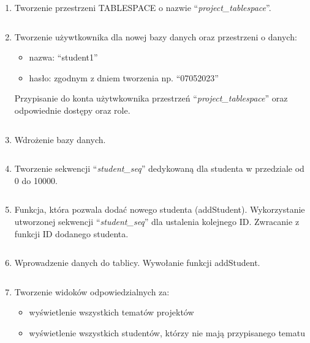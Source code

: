 \documentclass[a4paper, 10pt]{article}
\begin{document}
\begin{enumerate}
	\item Tworzenie przestrzeni TABLESPACE o nazwie ``\emph{project\_tablespace}''.
		\begin{lstlisting}[style=SQL, caption=\textit{Tworzenie przestrzeni TABLESPACE o nazwie ``project\_tablespace''}]
		\end{lstlisting}
	\item Tworzenie używtkownika dla nowej bazy danych oraz przestrzeni o danych:
		\begin{itemize}
			\item nazwa: ``student1''
			\item hasło: zgodnym z dniem tworzenia np. ``07052023''
		\end{itemize}
		Przypisanie do konta użytwkownika przestrzeń ``\emph{project\_tablespace}'' oraz odpowiednie dostępy oraz role.
		\begin{lstlisting}[style=SQL, caption=\textit{Tworzenie użytkownika}]
		\end{lstlisting}
	\item Wdrożenie bazy danych. 
		\begin{lstlisting}[style=SQL, caption=\textit{Wdrożenie bazy danych}]
		\end{lstlisting}
	\item Tworzenie sekwencji ``\emph{student\_seq}'' dedykowaną dla studenta w przedziale od 0 do 10000.
		\begin{lstlisting}[style=SQL, caption=\textit{Tworzenie sekwencji ``student\_seq''}]
		\end{lstlisting}
	\item Funkcja, która pozwala dodać nowego studenta (addStudent). Wykorzystanie utworzonej sekwencji ``\emph{student\_seq}'' dla ustalenia kolejnego ID. Zwracanie z funkcji ID dodanego studenta.
		\begin{lstlisting}[style=SQL, caption=\textit{Funkcja, która dodaje nowego studenta}]
		\end{lstlisting}
	\item Wprowadzenie danych do tablicy. Wywołanie funkcji addStudent.
		\begin{lstlisting}[style=SQL, caption=\textit{Wprowadzenie danych do tablicy}]
		\end{lstlisting}
	\item Tworzenie widoków odpowiedzialnych za:
		\begin{itemize}
			\item wyświetlenie wszystkich tematów projektów 
			\item wyświetlenie wszystkich studentów, którzy nie mają przypisanego tematu

\end{itemize}
\end{enumerate}
\end{document}
